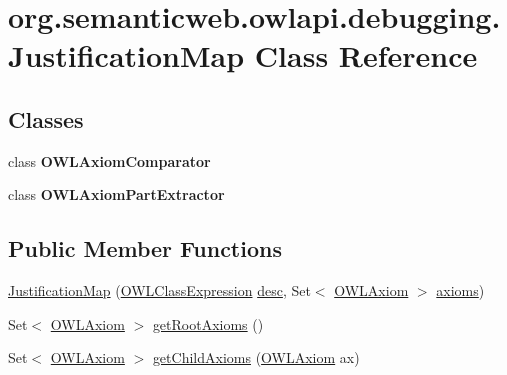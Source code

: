 \hypertarget{classorg_1_1semanticweb_1_1owlapi_1_1debugging_1_1_justification_map}{\section{org.\-semanticweb.\-owlapi.\-debugging.\-Justification\-Map Class Reference}
\label{classorg_1_1semanticweb_1_1owlapi_1_1debugging_1_1_justification_map}
}
\subsection*{Classes}
\begin{DoxyCompactItemize}
\item 
class {\bfseries O\-W\-L\-Axiom\-Comparator}
\item 
class {\bfseries O\-W\-L\-Axiom\-Part\-Extractor}
\end{DoxyCompactItemize}
\subsection*{Public Member Functions}
\begin{DoxyCompactItemize}
\item 
\hyperlink{classorg_1_1semanticweb_1_1owlapi_1_1debugging_1_1_justification_map_afa56015fa7c5584ee9de859ff6ce9982}{Justification\-Map} (\hyperlink{interfaceorg_1_1semanticweb_1_1owlapi_1_1model_1_1_o_w_l_class_expression}{O\-W\-L\-Class\-Expression} \hyperlink{classorg_1_1semanticweb_1_1owlapi_1_1debugging_1_1_justification_map_a913953c5eebf6b4726856e9ef0b2979d}{desc}, Set$<$ \hyperlink{interfaceorg_1_1semanticweb_1_1owlapi_1_1model_1_1_o_w_l_axiom}{O\-W\-L\-Axiom} $>$ \hyperlink{classorg_1_1semanticweb_1_1owlapi_1_1debugging_1_1_justification_map_a8a1c67363e2e64bf3f82bcbb050fa005}{axioms})
\item 
Set$<$ \hyperlink{interfaceorg_1_1semanticweb_1_1owlapi_1_1model_1_1_o_w_l_axiom}{O\-W\-L\-Axiom} $>$ \hyperlink{classorg_1_1semanticweb_1_1owlapi_1_1debugging_1_1_justification_map_a74b70474336e19d3e029a15717aefbe3}{get\-Root\-Axioms} ()
\item 
Set$<$ \hyperlink{interfaceorg_1_1semanticweb_1_1owlapi_1_1model_1_1_o_w_l_axiom}{O\-W\-L\-Axiom} $>$ \hyperlink{classorg_1_1semanticweb_1_1owlapi_1_1debugging_1_1_justification_map_a004a6ef69143800edde9e0f5356f09c1}{get\-Child\-Axioms} (\hyperlink{interfaceorg_1_1semanticweb_1_1owlapi_1_1model_1_1_o_w_l_axiom}{O\-W\-L\-Axiom} ax)
\end{DoxyCompactItemize}
